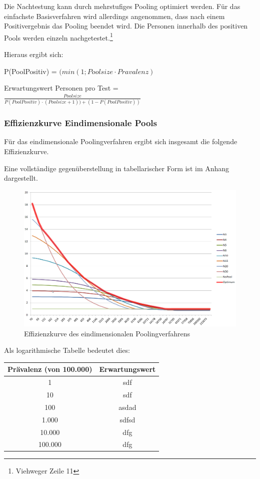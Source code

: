 Die Nachtestung kann durch mehrstufiges Pooling optimiert werden.
Für das einfachste Basisverfahren wird allerdings angenommen, dass nach einem Positivergebnis das Pooling beendet wird.
Die Personen innerhalb des positiven Pools werden einzeln nachgetestet.\footnote{Viehweger Zeile 11}

Hieraus ergibt sich:

P(PoolPositiv) = $(min\left(1;Poolsize\cdot Pravalenz\right)$

Erwartungswert Personen pro Test =
$\frac{Poolsize}{P(PoolPositiv)\cdot (Poolsize + 1)) + (1 - P(PoolPositiv))}$

\subsubsection{Effizienzkurve Eindimensionale Pools}
Für das eindimensionale Poolingverfahren ergibt sich insgesamt die folgende Effizienzkurve.

Eine vollständige gegenüberstellung in tabellarischer Form ist im Anhang dargestellt.
\begin{figure}[h]
	\centering
	\includegraphics[height=.6\textwidth]{img/1D_Pool-EffKurve}
	\caption{Effizienzkurve des eindimensionalen Poolingverfahrens\footnotemark}
\end{figure}

Als logarithmische Tabelle bedeutet dies:

\begin{tabular}{|c|c|}
	\hline
	Prävalenz (von 100.000) & Erwartungswert \\
	\hline
	1 & sdf \\
	\hline
	10 & sdf \\
	\hline
	100 & asdad \\
	\hline
	1.000 & sdfsd \\
	\hline
	10.000 & dfg \\
	\hline
	100.000 & dfg \\
	\hline
\end{tabular}

